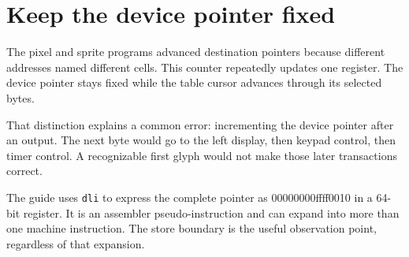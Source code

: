 \section{Keep the device pointer
  fixed}\label{005-seven-segment-counter-p02-keep-the-device-pointer-fixed}

The pixel and sprite programs advanced destination pointers because
different addresses named different cells. This counter repeatedly
updates one register. The device pointer stays fixed while the table
cursor advances through its selected bytes.

That distinction explains a common error: incrementing the device
pointer after an output. The next byte would go to the left display,
then keypad control, then timer control. A recognizable first glyph
would not make those later transactions correct.

The guide uses \texttt{dli} to express the complete pointer as
00000000ffff0010 in a 64-bit register. It is an assembler
pseudo-instruction and can expand into more than one machine
instruction. The store boundary is the useful observation point,
regardless of that expansion.
